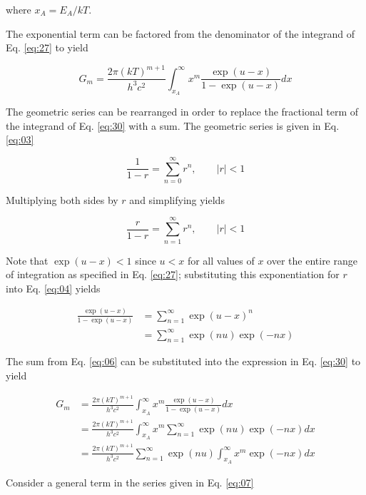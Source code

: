 \documentclass[aip,jap,reprint]{revtex4-1}
\begin{document}
\noindent where $x_{A} = E_{A}/kT$.

The exponential term can be factored from the denominator of the integrand of Eq. \ref{eq:27} to yield

\begin{equation} \label{eq:30}
G_{m} = \frac{2 \pi (kT)^{m+1}}{h^{3}c^{2}} \int_{x_{A}}^{\infty} x^{m} \frac{\exp(u-x)}{1 - \exp(u-x)} dx
\end{equation}


The geometric series can be rearranged in order to replace the fractional term of the integrand of Eq. \ref{eq:30} with a sum. The geometric series is given in Eq. \ref{eq:03}

\begin{equation} \label{eq:03}
\frac{1}{1-r} = \sum_{n = 0}^{\infty} r^{n}, \qquad |r| < 1
\end{equation}

\noindent Multiplying both sides by $r$ and simplifying yields

\begin{equation} \label{eq:04}
\frac{r}{1-r} = \sum_{n = 1}^{\infty} r^{n}, \qquad |r| < 1
\end{equation}


Note that $\exp(u-x) < 1$ since $u < x$ for all values of $x$ over the entire range of integration as specified in Eq. \ref{eq:27}; substituting this exponentiation for $r$ into Eq. \ref{eq:04} yields

\begin{align} \label{eq:06}
\frac{\exp(u-x)}{1 - \exp(u-x)} &= \sum_{n = 1}^{\infty} \exp(u-x)^{n} \nonumber \\
 &= \sum_{n = 1}^{\infty} \exp(nu) \exp(-nx)
\end{align}


The sum from Eq. \ref{eq:06} can be substituted into the expression in Eq. \ref{eq:30} to yield

\begin{align} \label{eq:07}
G_{m} &= \frac{2\pi (kT)^{m+1}}{h^{3} c^{2}} \int_{x_{A}}^{\infty} x^{m} \frac{\exp(u-x)}{1 - \exp(u-x)} dx \nonumber \\
 &= \frac{2\pi (kT)^{m+1}}{h^{3} c^{2}} \int_{x_{A}}^{\infty} x^{m} \sum_{n = 1}^{\infty} \exp(nu) \exp(-nx) dx \nonumber \\
 &= \frac{2\pi (kT)^{m+1}}{h^{3} c^{2}} \sum_{n = 1}^{\infty} \exp(nu) \int_{x_{A}}^{\infty} x^{m} \exp(-nx) dx
\end{align}

Consider a general term in the series given in Eq. \ref{eq:07}
\end{document}
